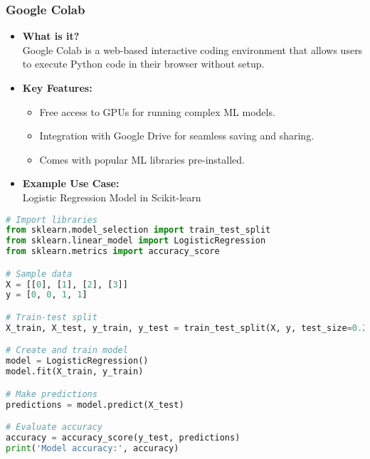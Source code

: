 \documentclass[aspectratio=169]{beamer}
\begin{document}
\begin{frame}[fragile]
    \frametitle{Google Colab}
    \begin{itemize}
        \item \textbf{What is it?} \\
        Google Colab is a web-based interactive coding environment that allows users to execute Python code in their browser without setup.
        
        \item \textbf{Key Features:}
        \begin{itemize}
            \item Free access to GPUs for running complex ML models.
            \item Integration with Google Drive for seamless saving and sharing.
            \item Comes with popular ML libraries pre-installed.
        \end{itemize}
        
        \item \textbf{Example Use Case:} \\
        Logistic Regression Model in Scikit-learn
    \end{itemize}
    
    \begin{lstlisting}[language=Python]
# Import libraries
from sklearn.model_selection import train_test_split
from sklearn.linear_model import LogisticRegression
from sklearn.metrics import accuracy_score

# Sample data
X = [[0], [1], [2], [3]]
y = [0, 0, 1, 1]

# Train-test split
X_train, X_test, y_train, y_test = train_test_split(X, y, test_size=0.2)

# Create and train model
model = LogisticRegression()
model.fit(X_train, y_train)

# Make predictions
predictions = model.predict(X_test)

# Evaluate accuracy
accuracy = accuracy_score(y_test, predictions)
print('Model accuracy:', accuracy)
    \end{lstlisting}
\end{frame}
\end{document}
